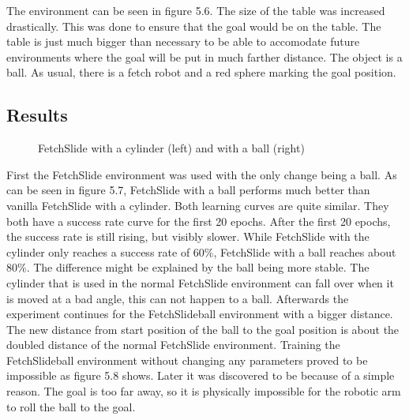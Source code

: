 The environment can be seen in figure 5.6. The size of the table was increased drastically. This was done to ensure that the goal would be on the table. The table is just much bigger than necessary to be able to accomodate future environments where the goal will be put in much farther distance. The object is a ball. As usual, there is a fetch robot and a red sphere marking the goal position. 




\subsection{Results}


\begin{figure} [h]
	
	\centering
	\caption{FetchSlide with a cylinder (left) and with a ball (right)}
	
\end{figure}


First the FetchSlide environment was used with the only change being a ball. As can be seen in figure 5.7, FetchSlide with a ball performs much better than vanilla FetchSlide with a cylinder. Both learning curves are quite similar. They both have a success rate curve for the first 20 epochs. After the first 20 epochs, the success rate is still rising, but visibly slower. While FetchSlide with the cylinder only reaches a success rate of 60\%, FetchSlide with a ball reaches about 80\%. The difference might be explained by the ball being more stable. The cylinder that is used in the normal FetchSlide environment can fall over when it is moved at a bad angle, this can not happen to a ball.
Afterwards the experiment continues for the FetchSlideball environment with a bigger distance. The new distance from start position of the ball to the goal position is about the doubled distance of the normal FetchSlide environment.
Training the FetchSlideball environment without changing any parameters proved to be impossible as figure 5.8 shows. Later it was discovered to be because of a simple reason. The goal is too far away, so it is physically impossible for the robotic arm to roll the ball to the goal.
 
